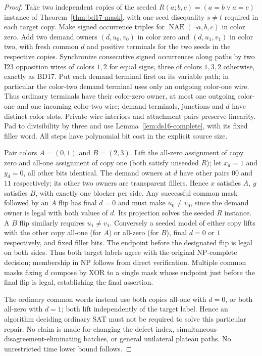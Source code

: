\documentclass[11pt]{article}
\begin{document}
\begin{proof}
Take two independent copies of the seeded $R(a;b,c)=(a=b\lor a=c)$ instance of Theorem~\ref{thm:bd17-mask}, with one seed disequality $s\ne t$ required in each target copy. Make signed occurrence triples for $\operatorname{NAE}(\neg a,b,c)$ in color zero. Add two demand owners $(d,u_0,v_0)$ in color zero and $(d,u_1,v_1)$ in color two, with fresh common $d$ and positive terminals for the two seeds in the respective copies. Synchronize consecutive signed occurrences along paths by two I23 opposition wires of colors $1,2$ for equal signs, three of colors $1,3,2$ otherwise, exactly as BD17. Put each demand terminal first on its variable path; in particular the color-two demand terminal uses only an outgoing color-one wire. Thus ordinary terminals have their color-zero owner, at most one outgoing color-one and one incoming color-two wire; demand terminals, junctions and $d$ have distinct color slots. Private wire interiors and attachment pairs preserve linearity. Pad to divisibility by three and use Lemma~\ref{lem:ds16-complete}, with its fixed filler word. All steps have polynomial bit cost in the explicit source size.
 
Pair colors $A=(0,1)$ and $B=(2,3)$. Lift the all-zero assignment of copy zero and all-one assignment of copy one (both satisfy unseeded $R$); let $x_d=1$ and $y_d=0$, all other bits identical. The demand owners at $d$ have other pairs $00$ and $11$ respectively; its other two owners are transparent fillers. Hence $x$ satisfies $A$, $y$ satisfies $B$, with exactly one blocker per side. Any successful common mask followed by an $A$ flip has final $d=0$ and must make $u_0\ne v_0$, since the demand owner is legal with both values of $d$. Its projection solves the seeded $R$ instance. A $B$ flip similarly requires $u_1\ne v_1$. Conversely a seeded model of either copy lifts with the other copy all-one (for $A$) or all-zero (for $B$), final $d=0$ or $1$ respectively, and fixed filler bits. The endpoint before the designated flip is legal on both sides. Thus both target labels agree with the original NP-complete decision; membership in NP follows from direct verification. Multiple common masks fixing $d$ compose by XOR to a single mask whose endpoint just before the final flip is legal, establishing the final assertion.
 
The ordinary common words instead use both copies all-one with $d=0$, or both all-zero with $d=1$; both lift independently of the target label. Hence an algorithm deciding ordinary SAT must not be required to solve this particular repair. No claim is made for changing the defect index, simultaneous disagreement-eliminating batches, or general unilateral plateau paths. No unrestricted time lower bound follows.
\end{proof}
\end{document}
